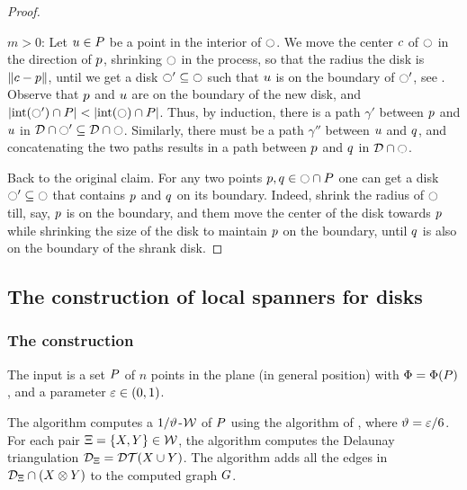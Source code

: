 \documentclass[12pt]{article}%
\begin{document}
\begin{proof}
\begin{compactitem}
\begin{figure}[h]
            \caption{}
        \end{figure}
        \item $m >0$: Let $u\in P$ be a point in the interior of
        $\ocircle$. We move the center $c$ of $\ocircle$ in the direction
        of $p$, shrinking $\ocircle$ in the process, so that the radius
        the disk is $\left\| c - p \right\|$, until we get a disk
        $\ocircle' \subseteq \ocircle$ such that $u$ is on the boundary of
        $\ocircle'$, see . Observe that $p$ and $u$
        are on the boundary of the new disk, and
        $|\interiorX{\disk'} \cap \PS| < |\interiorX{\disk} \cap
        \PS|$. Thus, by induction, there is a path $\gamma'$ between
        $p$ and $u$ in
        $\mathcal{D} \cap {\ocircle'} \subseteq
        \mathcal{D} \cap {\ocircle}$. Similarly, there must be a path
        $\gamma''$ between $u$ and $q$, and concatenating the two
        paths results in a path between $p$ and $q$ in
        $\mathcal{D} \cap {\ocircle}$.
    \end{compactitem}
    \medskip%
    \noindent
    Back to the original claim.  For any two points
    $p,q \in \ocircle \cap P$ one can get a disk
    $\ocircle' \subseteq \ocircle$ that contains $p$ and $q$ on its
    boundary.  Indeed, shrink the radius of $\ocircle$ till, say, $p$
    is on the boundary, and them move the center of the disk towards
    $p$ while shrinking the size of the disk to maintain $p$ on
    the boundary, until $q$ is also on the boundary of the shrank
    disk.
\end{proof}



\subsection{The construction of local spanners for disks}

\subsubsection{The construction}
\label{subsec:disk_construction}

The input is a set $P$ of $n$ points in the plane (in general
position) with $\spread = \spreadX{\PS}$, and a parameter
$\varepsilon \in (0,1)$.

The algorithm computes a $1/\vartheta$-\WSPD $\mathcal{W}$ of $P$ using the
algorithm of , where $\vartheta = \varepsilon/6$.  For
each pair $\Xi = \{X, Y \} \in \mathcal{W}$, the algorithm computes
the Delaunay triangulation $\DT_{\Pair} = \DTX{ \PSX \cup \PSY}$. The
algorithm adds all the edges in $\mathcal{D}_{\Xi} \cap (X \otimes Y)$
to the computed graph $G$.
\end{document}
